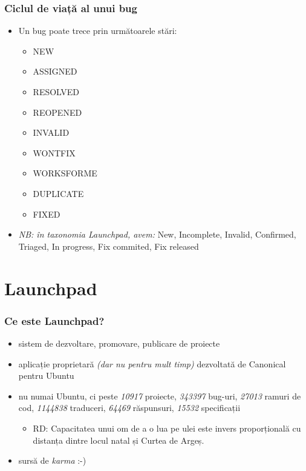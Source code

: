 \documentclass{beamer}
\begin{document}
\begin{frame}
\frametitle{Ciclul de viață al unui bug}
\begin{itemize}
\item Un bug poate trece prin următoarele stări:
\begin{itemize}
\item NEW
\item ASSIGNED
\item RESOLVED
\item REOPENED
\item INVALID
\item WONTFIX
\item WORKSFORME
\item DUPLICATE
\item FIXED
\end{itemize}
\pause \item \emph{NB: în taxonomia Launchpad, avem:} New, Incomplete, Invalid, Confirmed, Triaged, In progress, Fix commited, Fix released
\end{itemize}
\end{frame}

\section{Launchpad}
\frame{\tableofcontents[currentsection]}

\begin{frame}
\frametitle{Ce este Launchpad?}
\begin{itemize}
\pause \item sistem de dezvoltare, promovare, publicare de proiecte
\pause \item aplicație proprietară \emph{(dar nu pentru mult timp)} dezvoltată de Canonical pentru Ubuntu
\pause \item nu numai Ubuntu, ci peste \emph{10917} proiecte, \emph{343397} bug-uri, \emph{27013} ramuri de cod, \emph{1144838} traduceri, \emph{64469} răspunsuri, \emph{15532} specificații
\begin{itemize}
\pause \item RD: Capacitatea unui om de a o lua pe ulei este invers
proporțională cu distanța dintre locul natal și Curtea de Argeș.
\end{itemize}
\pause \item sursă de \emph{karma} :-)
\end{itemize}
\end{frame} 
\end{document}
